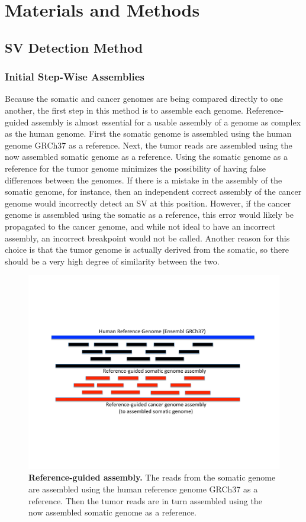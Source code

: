 \documentclass{easychithesis}
\begin{document}
\chapter{Materials and Methods}

\section{SV Detection Method}
\subsection{Initial Step-Wise Assemblies}
Because the somatic and cancer genomes are being compared directly to one another, the first step in this method is to assemble each genome. Reference-guided assembly is almost essential for a usable assembly of a genome as complex as the human genome. First the somatic genome is assembled using the human genome GRCh37 as a reference. Next, the tumor reads are assembled using the now assembled somatic genome as a reference. Using the somatic genome as a reference for the tumor genome minimizes the possibility of having false differences between the genomes. If there is a mistake in the assembly of the somatic genome, for instance, then an independent correct assembly of the cancer genome would incorrectly detect an SV at this position. However, if the cancer genome is assembled using the somatic as a reference, this error would likely be propagated to the cancer genome, and while not ideal to have an incorrect assembly, an incorrect breakpoint would not be called. Another reason for this choice is that the tumor genome is actually derived from the somatic, so there should be a very high degree of similarity between the two.

\begin{figure}[!ht]
\begin{center}
\includegraphics[width = 0.95  \linewidth]{../Code/Figures/RefGuidedAssembly.pdf}
\end{center}
\caption{{\bf Reference-guided assembly.}  The reads from the somatic genome are assembled using the human reference genome GRCh37 as a reference. Then the tumor reads are in turn assembled using the now assembled somatic genome as a reference.}
\label{fig:RefGuidedAssembly}
\end{figure}
\end{document}
